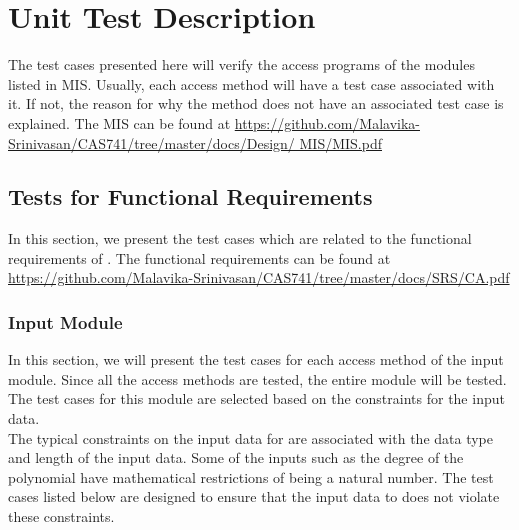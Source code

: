 \documentclass[12pt, titlepage]{article}
\begin{document}

\section{Unit Test Description}

The test cases presented here will verify the access programs of the modules 
listed in MIS. Usually, each access method will have a test case associated 
with it. If not, the reason for why the method does not have an associated test 
case is explained. The MIS can be found at 
\url{https://github.com/Malavika-Srinivasan/CAS741/tree/master/docs/Design/
	MIS/MIS.pdf}

\subsection{Tests for Functional Requirements}

In this section, we present the test cases which are related to the functional 
requirements of \famname{}. The functional requirements can be found at 
\url{https://github.com/Malavika-Srinivasan/CAS741/tree/master/docs/SRS/CA.pdf}
 

\subsubsection {Input Module}

In this section, we will present the test cases for each access method of the 
input module. Since all the access methods are tested, the entire module will 
be tested. The test cases for this module are selected based on the constraints 
for the input data. \\
The typical constraints on the input data for \famname{} are associated with 
the data type and length of the input data. Some of the inputs such as the 
degree 
of the polynomial have mathematical restrictions of being a natural number. The 
test cases listed below are designed to ensure that the input data to 
\famname{} does not violate these constraints.  
\end{document}
